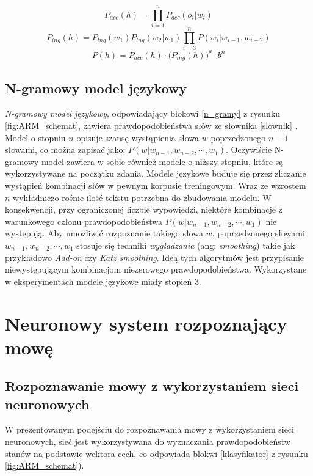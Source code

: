 \documentclass[shortabstract, mgr]{iithesis}
\newcommand{\refBlock}[1]{
	\hyperref[#1]{\ref*{#1}}
}
\begin{document}
		\begin{equation}
			P_{acc}(h) = \prod_{i=1}^n P_{acc}(o_i|w_i)
		\end{equation}
		\begin{equation}
			P_{lng}(h) = P_{lng}(w_1)P_{lng}(w_2|w_1)\prod_{i=3}^nP(w_i|w_{i-1},w_{i-2})
		\end{equation}
		\begin{equation}
			P(h) = P_{acc}(h) \cdot \bigg(P_{lng}(h)\bigg)^a \cdot b^n
		\label{eqn:h_score}
		\end{equation}
	
\section{N-gramowy model językowy}
	\label{sec:ngramm}
	\textit{N-gramowy model językowy}, odpowiadający blokowi \refBlock{n_gramy} z rysunku \ref{fig:ARM_schemat}, zawiera prawdopodobieństwa słów ze słownika \refBlock{slownik}. Model o stopniu $n$ opisuje szansę wystąpienia słowa $w$ poprzedzonego $n-1$ słowami, co można zapisać jako: $P(w|w_{n-1},w_{n-2},\cdots,w_1)$. Oczywiście N-gramowy model zawiera w sobie również modele o niższy stopniu, które są wykorzystywane na początku zdania. Modele językowe buduje się przez zliczanie wystąpień kombinacji słów w pewnym korpusie treningowym. Wraz ze wzrostem $n$ wykładniczo rośnie ilość tekstu potrzebna do zbudowania modelu. W konsekwencji, przy ograniczonej liczbie wypowiedzi, niektóre kombinacje z warunkowego członu prawdopodobieństwa  $P(w|w_{n-1},w_{n-2},\cdots,w_1)$ nie występują. Aby umożliwić rozpoznanie takiego słowa $w$, poprzedzonego słowami $w_{n-1},w_{n-2},\cdots,w_1$ stosuje się techniki \textit{wygładzania} (ang: \textit{smoothing}) takie jak przykładowo \textit{Add-on} czy \textit{Katz smoothing}. Ideą tych algorytmów jest przypisanie niewystępującym kombinacjom niezerowego prawdopodobieństwa. Wykorzystane w eksperymentach modele językowe miały stopień $3$.

\chapter{Neuronowy system rozpoznający mowę}
\section{Rozpoznawanie mowy z wykorzystaniem sieci neuronowych}
	\label{sec:ASR_NN}
	W prezentowanym podejściu do rozpoznawania mowy z wykorzystaniem sieci neuronowych, sieć jest wykorzystywana do wyznaczania prawdopodobieństw stanów na podstawie wektora cech, co odpowiada blokwi \refBlock{klasyfikator} z rysunku \ref{fig:ARM_schemat}).
	
\end{document}
